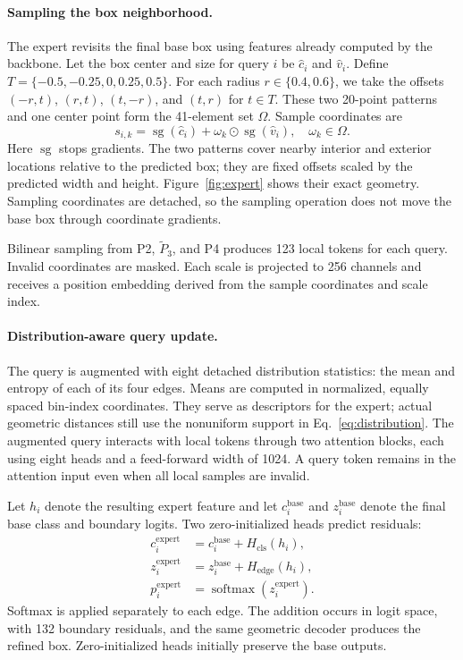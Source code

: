 \paragraph{Sampling the box neighborhood.}
The expert revisits the final base box using features already computed by the backbone. Let the box center and size for query $i$ be $\hat c_i$ and $\hat v_i$. Define $T=\{-0.5,-0.25,0,0.25,0.5\}$. For each radius $r\in\{0.4,0.6\}$, we take the offsets $(-r,t)$, $(r,t)$, $(t,-r)$, and $(t,r)$ for $t\in T$. These two 20-point patterns and one center point form the 41-element set $\Omega$. Sample coordinates are
\begin{equation}
s_{i,k}=\operatorname{sg}(\hat c_i)+
\omega_k\odot\operatorname{sg}(\hat v_i),\quad\omega_k\in\Omega.
\label{eq:sampling}
\end{equation}
Here $\operatorname{sg}$ stops gradients. The two patterns cover nearby interior and exterior locations relative to the predicted box; they are fixed offsets scaled by the predicted width and height. Figure~\ref{fig:expert} shows their exact geometry. Sampling coordinates are detached, so the sampling operation does not move the base box through coordinate gradients.

Bilinear sampling from P2, $\widetilde P_3$, and P4 produces 123 local tokens for each query. Invalid coordinates are masked. Each scale is projected to 256 channels and receives a position embedding derived from the sample coordinates and scale index.

\paragraph{Distribution-aware query update.}
The query is augmented with eight detached distribution statistics: the mean and entropy of each of its four edges. Means are computed in normalized, equally spaced bin-index coordinates. They serve as descriptors for the expert; actual geometric distances still use the nonuniform support in Eq.~\eqref{eq:distribution}. The augmented query interacts with local tokens through two attention blocks, each using eight heads and a feed-forward width of 1024. A query token remains in the attention input even when all local samples are invalid.

Let $h_i$ denote the resulting expert feature and let $c_i^{\mathrm{base}}$ and $z_i^{\mathrm{base}}$ denote the final base class and boundary logits. Two zero-initialized heads predict residuals:
\begin{equation}
\begin{aligned}
c_i^{\mathrm{expert}}&=c_i^{\mathrm{base}}+H_{\mathrm{cls}}(h_i),\\
z_i^{\mathrm{expert}}&=z_i^{\mathrm{base}}+H_{\mathrm{edge}}(h_i),\\
p_i^{\mathrm{expert}}&=\operatorname{softmax}(z_i^{\mathrm{expert}}).
\end{aligned}
\label{eq:residual}
\end{equation}
Softmax is applied separately to each edge. The addition occurs in logit space, with 132 boundary residuals, and the same geometric decoder produces the refined box. Zero-initialized heads initially preserve the base outputs.

